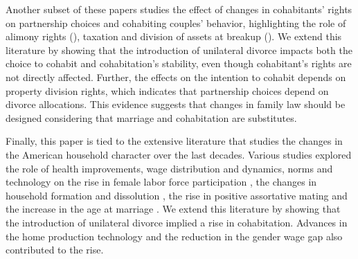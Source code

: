 \documentclass[12pt]{article}
\numberwithin{table}{section}
\begin{document}
Another subset of these papers studies the effect of changes in cohabitants' rights on partnership choices and cohabiting couples' behavior, highlighting the role of alimony rights  (\citealp{chiappori2017,gousse2018}), taxation \cite{leturcq2012} and division of assets at breakup (\citealp{fisher2012,gousse2018,chigavazira2019}). We extend this literature by showing that the introduction of unilateral divorce impacts both the choice to cohabit and cohabitation's stability, even though cohabitant's rights are not directly affected. Further, the effects on the intention to cohabit depends on property division rights, which indicates that partnership choices depend on divorce allocations. This evidence suggests that changes in family law should be designed considering that marriage and cohabitation are substitutes. 

Finally, this paper is tied to the extensive literature that studies the changes in the American household character over the last decades. Various studies explored the role of health improvements, wage distribution and dynamics, norms and technology on the rise in female labor force participation \citep{fernandez2004,greenwood2005,albanesi2016,greenwood2016}, the changes in household formation and dissolution \citep{greenwood2016,ciscato2019}, the rise in positive assortative mating \citep{fernandez2005,greenwood2016,ciscato2019} and the increase in the age at marriage \citep{santos2016}. We extend this literature by showing that the introduction of unilateral divorce implied a rise in cohabitation. Advances in the home production technology and the reduction in the gender wage gap also contributed to the rise.
\end{document}
